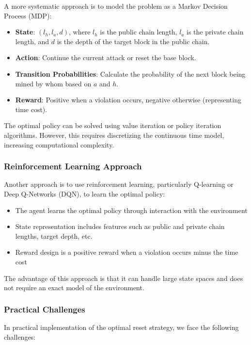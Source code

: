 \documentclass[12pt,a4paper]{article}
\begin{document}
A more systematic approach is to model the problem as a Markov Decision Process (MDP):

\begin{itemize}
    \item \textbf{State}: $(l_h, l_a, d)$, where $l_h$ is the public chain length, $l_a$ is the private chain length, and $d$ is the depth of the target block in the public chain.
    \item \textbf{Action}: Continue the current attack or reset the base block.
    \item \textbf{Transition Probabilities}: Calculate the probability of the next block being mined by whom based on $a$ and $h$.
    \item \textbf{Reward}: Positive when a violation occurs, negative otherwise (representing time cost).
\end{itemize}

The optimal policy can be solved using value iteration or policy iteration algorithms. However, this requires discretizing the continuous time model, increasing computational complexity.

\subsubsection{Reinforcement Learning Approach}

Another approach is to use reinforcement learning, particularly Q-learning or Deep Q-Networks (DQN), to learn the optimal policy:

\begin{itemize}
    \item The agent learns the optimal policy through interaction with the environment
    \item State representation includes features such as public and private chain lengths, target depth, etc.
    \item Reward design is a positive reward when a violation occurs minus the time cost
\end{itemize}

The advantage of this approach is that it can handle large state spaces and does not require an exact model of the environment.

\subsubsection{Practical Challenges}

In practical implementation of the optimal reset strategy, we face the following challenges:
\end{document}
